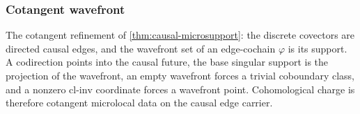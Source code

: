 \subsubsection{Cotangent wavefront}

\begin{theorem}\label{thm:cotangent-microsupport}\leanok{}
The cotangent refinement of \cref{thm:causal-microsupport}: the discrete
covectors are directed causal edges, and the wavefront set of an edge-cochain
$\varphi$ is its support. A codirection points into the causal future, the base
singular support is the projection of the wavefront, an empty wavefront forces
a trivial coboundary class, and a nonzero $\mathrm{cl\text{-}inv}$ coordinate
forces a wavefront point. Cohomological charge is therefore cotangent
microlocal data on the causal edge carrier.
\end{theorem}
